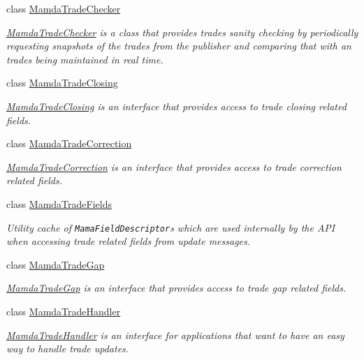 \begin{CompactItemize}
class \hyperlink{classWombat_1_1MamdaTradeChecker}{Mamda\-Trade\-Checker}
\begin{CompactList}\small\item\em \hyperlink{classWombat_1_1MamdaTradeChecker}{Mamda\-Trade\-Checker} is a class that provides trades sanity checking by periodically requesting snapshots of the trades from the publisher and comparing that with an trades being maintained in real time. \item\end{CompactList}\item 
class \hyperlink{classWombat_1_1MamdaTradeClosing}{Mamda\-Trade\-Closing}
\begin{CompactList}\small\item\em \hyperlink{classWombat_1_1MamdaTradeClosing}{Mamda\-Trade\-Closing} is an interface that provides access to trade closing related fields. \item\end{CompactList}\item 
class \hyperlink{classWombat_1_1MamdaTradeCorrection}{Mamda\-Trade\-Correction}
\begin{CompactList}\small\item\em \hyperlink{classWombat_1_1MamdaTradeCorrection}{Mamda\-Trade\-Correction} is an interface that provides access to trade correction related fields. \item\end{CompactList}\item 
class \hyperlink{classWombat_1_1MamdaTradeFields}{Mamda\-Trade\-Fields}
\begin{CompactList}\small\item\em Utility cache of {\tt Mama\-Field\-Descriptor}s which are used internally by the API when accessing trade related fields from update messages. \item\end{CompactList}\item 
class \hyperlink{classWombat_1_1MamdaTradeGap}{Mamda\-Trade\-Gap}
\begin{CompactList}\small\item\em \hyperlink{classWombat_1_1MamdaTradeGap}{Mamda\-Trade\-Gap} is an interface that provides access to trade gap related fields. \item\end{CompactList}\item 
class \hyperlink{classWombat_1_1MamdaTradeHandler}{Mamda\-Trade\-Handler}
\begin{CompactList}\small\item\em \hyperlink{classWombat_1_1MamdaTradeHandler}{Mamda\-Trade\-Handler} is an interface for applications that want to have an easy way to handle trade updates. \item\end{CompactList}\item 

\end{CompactItemize}

